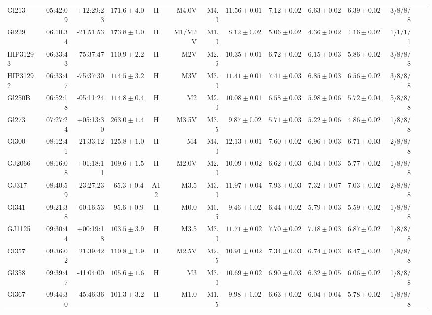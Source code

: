 \documentclass{aa}
\begin{document}
\begin{table}[h!]
{\begin{tabular}{ l r r r c r r r r r r r r r}
Gl213 & 05:42:09 & +12:29:23 & $171.6 \pm  4.0$ & H & M4.0V & M4.0 &  $11.56 \pm 0.01$ & $7.12 \pm 0.02$ & $6.63 \pm 0.02$ & $6.39 \pm 0.02$ & 3/8/8/8 \\
Gl229 & 06:10:34 & -21:51:53 & $173.8 \pm  1.0$ & H & M1/M2V & M1.0 &  $8.12 \pm 0.02$ & $5.06 \pm 0.02$ & $4.36 \pm 0.02$ & $4.16 \pm 0.02$ & 1/1/1/1 \\
HIP31293 & 06:33:43 & -75:37:47 & $110.9 \pm  2.2$ & H & M2V & M2.5 &  $10.35 \pm 0.01$ & $6.72 \pm 0.02$ & $6.15 \pm 0.03$ & $5.86 \pm 0.02$ & 3/8/8/8 \\
HIP31292 & 06:33:47 & -75:37:30 & $114.5 \pm  3.2$ & H & M3V & M3.0 &  $11.41 \pm 0.01$ & $7.41 \pm 0.03$ & $6.85 \pm 0.03$ & $6.56 \pm 0.02$ & 3/8/8/8 \\
Gl250B & 06:52:18 & -05:11:24 & $114.8 \pm  0.4$ & H & M2 & M2.0 &  $10.08 \pm 0.01$ & $6.58 \pm 0.03$ & $5.98 \pm 0.06$ & $5.72 \pm 0.04$ & 5/8/8/8 \\
Gl273 & 07:27:24 & +05:13:30 & $263.0 \pm  1.4$ & H & M3.5V & M3.5 &  $9.87 \pm 0.02$ & $5.71 \pm 0.03$ & $5.22 \pm 0.06$ & $4.86 \pm 0.02$ & 1/8/8/8 \\
Gl300 & 08:12:41 & -21:33:12 & $125.8 \pm  1.0$ & H & M4 & M4.0 &  $12.13 \pm 0.01$ & $7.60 \pm 0.02$ & $6.96 \pm 0.03$ & $6.71 \pm 0.03$ & 2/8/8/8 \\
GJ2066 & 08:16:08 & +01:18:11 & $109.6 \pm  1.5$ & H & M2.0V & M2.0 &  $10.09 \pm 0.02$ & $6.62 \pm 0.03$ & $6.04 \pm 0.03$ & $5.77 \pm 0.02$ & 1/8/8/8 \\
GJ317 & 08:40:59 & -23:27:23 & $65.3 \pm  0.4$ & A12 & M3.5 & M3.0 &  $11.97 \pm 0.04$ & $7.93 \pm 0.03$ & $7.32 \pm 0.07$ & $7.03 \pm 0.02$ & 2/8/8/8 \\
Gl341 & 09:21:38 & -60:16:53 & $95.6 \pm  0.9$ & H & M0.0 & M0.5 &  $9.46 \pm 0.02$ & $6.44 \pm 0.02$ & $5.79 \pm 0.03$ & $5.59 \pm 0.02$ & 1/8/8/8 \\
GJ1125 & 09:30:44 & +00:19:18 & $103.5 \pm  3.9$ & H & M3.5 & M3.0 &  $11.71 \pm 0.02$ & $7.70 \pm 0.02$ & $7.18 \pm 0.03$ & $6.87 \pm 0.02$ & 1/8/8/8 \\
Gl357 & 09:36:02 & -21:39:42 & $110.8 \pm  1.9$ & H & M2.5V & M2.5 &  $10.91 \pm 0.02$ & $7.34 \pm 0.03$ & $6.74 \pm 0.03$ & $6.47 \pm 0.02$ & 1/8/8/8 \\
Gl358 & 09:39:47 & -41:04:00 & $105.6 \pm  1.6$ & H & M3 & M3.0 &  $10.69 \pm 0.02$ & $6.90 \pm 0.03$ & $6.32 \pm 0.05$ & $6.06 \pm 0.02$ & 1/8/8/8 \\
Gl367 & 09:44:30 & -45:46:36 & $101.3 \pm  3.2$ & H & M1.0 & M1.5 &  $9.98 \pm 0.02$ & $6.63 \pm 0.02$ & $6.04 \pm 0.04$ & $5.78 \pm 0.02$ & 1/8/8/8 \\

\end{tabular}}
\end{table}
\end{document}
